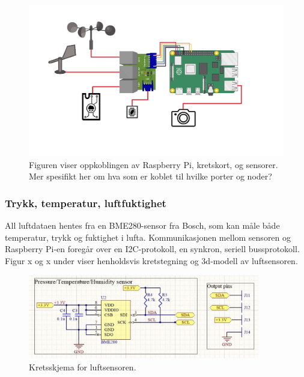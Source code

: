 \begin{figure}[H]
    \centering
    \includegraphics[width=\textwidth]{implementering/kretsskjema_pi.png}
    \caption{Figuren viser oppkoblingen av Raspberry Pi, kretskort, og sensorer. Mer spesifikt her om hva som er koblet til hvilke porter og noder?}
    \label{fig:kretsskjema_pi}
\end{figure}

\subsubsection{Trykk, temperatur, luftfuktighet}

All luftdataen hentes fra en BME280-sensor fra Bosch, som kan måle både temperatur, trykk og fuktighet i lufta. Kommunikasjonen mellom sensoren og Raspberry Pi-en foregår over en I2C-protokoll, en synkron, seriell bussprotokoll. Figur x og x under viser henholdsvis kretstegning og 3d-modell av luftsensoren.

\begin{figure}[H]
    \centering
    \includegraphics[width=0.9\textwidth]{implementering/luftsensor_krets.png}
    \caption{Kretsskjema for luftsensoren.}
    \label{fig:luftsensor_krets-}
\end{figure}

